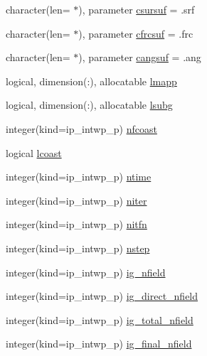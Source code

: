 \begin{DoxyCompactItemize}
character(len= $\ast$), parameter \hyperlink{namespacemod__oasis__namcouple_ad0ee67817c139b0c78721a9adf102cb3}{csursuf} = \textquotesingle{}.srf\textquotesingle{}
\item 
character(len= $\ast$), parameter \hyperlink{namespacemod__oasis__namcouple_aa2b2f64544e85c57f11059d22d0b2463}{cfrcsuf} = \textquotesingle{}.frc\textquotesingle{}
\item 
character(len= $\ast$), parameter \hyperlink{namespacemod__oasis__namcouple_a1fa86c01625d68460bf58d903a623011}{cangsuf} = \textquotesingle{}.ang\textquotesingle{}
\item 
logical, dimension(\+:), allocatable \hyperlink{namespacemod__oasis__namcouple_a8eca7c715a39c523e00ed2be0612950d}{lmapp}
\item 
logical, dimension(\+:), allocatable \hyperlink{namespacemod__oasis__namcouple_acda1605129987d656360e1ed81e8d199}{lsubg}
\item 
integer(kind=ip\+\_\+intwp\+\_\+p) \hyperlink{namespacemod__oasis__namcouple_a57f1b6f111a5257a4d6f5a4b18fa6250}{nfcoast}
\item 
logical \hyperlink{namespacemod__oasis__namcouple_a7657e0f9b495e291f26dc31b4f6145aa}{lcoast}
\item 
integer(kind=ip\+\_\+intwp\+\_\+p) \hyperlink{namespacemod__oasis__namcouple_a8a962108487c3ca092633bd4292dbfd6}{ntime}
\item 
integer(kind=ip\+\_\+intwp\+\_\+p) \hyperlink{namespacemod__oasis__namcouple_a6246780a56635119fd8f7935456b06cf}{niter}
\item 
integer(kind=ip\+\_\+intwp\+\_\+p) \hyperlink{namespacemod__oasis__namcouple_a1e5b5efd046e5ab959fba026bd645945}{nitfn}
\item 
integer(kind=ip\+\_\+intwp\+\_\+p) \hyperlink{namespacemod__oasis__namcouple_a66c36f23a77081749dc9e7993b0277f3}{nstep}
\item 
integer(kind=ip\+\_\+intwp\+\_\+p) \hyperlink{namespacemod__oasis__namcouple_a674f201daa7f2e1ba4c71221bda91d9c}{ig\+\_\+nfield}
\item 
integer(kind=ip\+\_\+intwp\+\_\+p) \hyperlink{namespacemod__oasis__namcouple_a531825c07a164f6139e5eebd59e295a2}{ig\+\_\+direct\+\_\+nfield}
\item 
integer(kind=ip\+\_\+intwp\+\_\+p) \hyperlink{namespacemod__oasis__namcouple_a3de3e6eb2bf1e81d77e9c117b7d5985f}{ig\+\_\+total\+\_\+nfield}
\item 
integer(kind=ip\+\_\+intwp\+\_\+p) \hyperlink{namespacemod__oasis__namcouple_a7cf04d6fb678ee65b7fbedc56a0d680a}{ig\+\_\+final\+\_\+nfield}

\end{DoxyCompactItemize}
